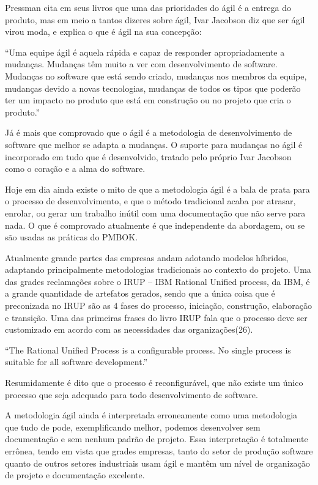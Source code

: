 Pressman cita em seus livros que uma das prioridades do ágil é a entrega do produto, mas em meio a tantos dizeres sobre ágil, Ivar Jacobson diz que ser ágil virou moda, e explica o que é ágil na sua concepção:

“Uma equipe ágil é aquela rápida e capaz de responder apropriadamente a mudanças. Mudanças têm muito a ver com desenvolvimento de software. Mudanças no software que está sendo criado, mudanças nos membros da equipe, mudanças devido a novas tecnologias, mudanças de todos os tipos que poderão ter um impacto no produto que está em construção ou no projeto que cria o produto.”

Já é mais que comprovado que o ágil é a metodologia de desenvolvimento de software que melhor se adapta a mudanças. O suporte para mudanças no ágil é incorporado em tudo que é desenvolvido, tratado pelo próprio Ivar Jacobson como o coração e a alma do software.

Hoje em dia ainda existe o mito de que a metodologia ágil é a bala de prata para o processo de desenvolvimento, e que o método tradicional acaba por atrasar, enrolar, ou gerar um trabalho inútil com uma documentação que não serve para nada. O que é comprovado atualmente é que independente da abordagem, ou se são usadas as práticas do PMBOK.

Atualmente grande partes das empresas andam adotando modelos híbridos, adaptando principalmente metodologias tradicionais ao contexto do projeto. Uma das grades reclamações sobre o IRUP – IBM Rational Unified process, da IBM, é a grande quantidade de artefatos gerados, sendo que a única coisa que é preconizada no IRUP são as 4 fases do processo, iniciação, construção, elaboração e transição.
Uma das primeiras frases do livro IRUP fala que o processo deve ser customizado em acordo com as necessidades das organizações(26).

“The Rational Unified Process is a configurable process. No single process is suitable for all software development.”

Resumidamente é dito que o processo é reconfigurável, que não existe um único processo que seja adequado para todo desenvolvimento de software.

A metodologia ágil ainda é interpretada erroneamente como uma metodologia que tudo de pode, exemplificando melhor, podemos desenvolver sem documentação e sem nenhum padrão de projeto. Essa interpretação é totalmente errônea, tendo em vista que grades empresas, tanto do setor de produção software quanto de outros setores industriais usam ágil e mantêm um nível de organização de projeto e documentação excelente.

